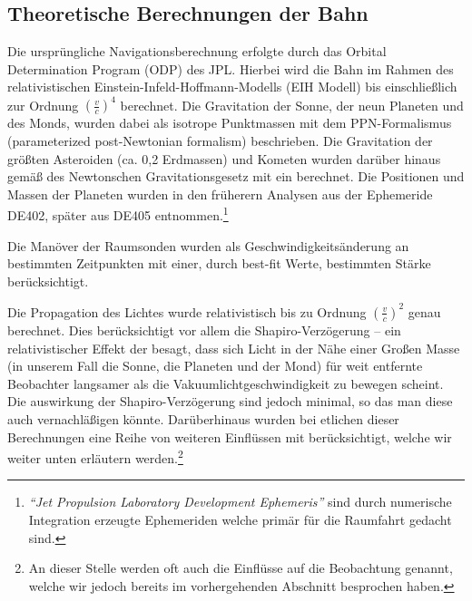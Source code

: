 
\subsection{Theoretische Berechnungen der Bahn}
Die ursprüngliche Navigationsberechnung erfolgte durch das Orbital Determination Program (ODP) des JPL.
Hierbei wird die Bahn im Rahmen des relativistischen Einstein-Infeld-Hoffmann-Modells (EIH Modell)
bis einschließlich zur Ordnung $(\frac{v}{c})^4$ berechnet.
Die Gravitation der Sonne, der neun Planeten und des Monds, wurden dabei als isotrope Punktmassen mit dem
PPN-Formalismus (parameterized post-Newtonian formalism) beschrieben\cite{Anderson2002}. Die Gravitation der größten
Asteroiden (ca. 0,2 Erdmassen) und Kometen wurden darüber hinaus gemäß des Newtonschen Gravitationsgesetz mit
ein berechnet. Die Positionen und Massen der Planeten wurden in den früherern Analysen aus der Ephemeride
DE402, später aus DE405 entnommen.\footnote{\textit{``Jet Propulsion Laboratory Development Ephemeris''} sind durch
numerische Integration erzeugte Ephemeriden welche primär für die Raumfahrt gedacht sind.}\cite{Anderson2002}

Die Manöver der Raumsonden wurden als Geschwindigkeitsänderung an bestimmten Zeitpunkten mit einer, durch best-fit Werte,
bestimmten Stärke berücksichtigt.\cite{Levy2008}	%

Die Propagation des Lichtes wurde relativistisch bis zu Ordnung $(\frac{v}{c})^2$ genau berechnet. Dies berücksichtigt
vor allem die Shapiro-Verzögerung – ein relativistischer Effekt der besagt, dass sich Licht in der Nähe einer Großen
Masse (in unserem Fall die Sonne, die Planeten und der Mond) für weit entfernte Beobachter langsamer als die
Vakuumlichtgeschwindigkeit zu bewegen scheint. %
Die auswirkung der Shapiro-Verzögerung sind jedoch minimal,\cite{Levy2008} so das man diese auch vernachläßigen könnte.
Darüberhinaus wurden bei etlichen dieser Berechnungen eine Reihe von weiteren Einflüssen mit berücksichtigt, welche wir
weiter unten %
erläutern werden.\footnote{An dieser Stelle werden oft auch die Einflüsse auf die Beobachtung genannt, welche wir jedoch
bereits im vorhergehenden Abschnitt besprochen haben.}


